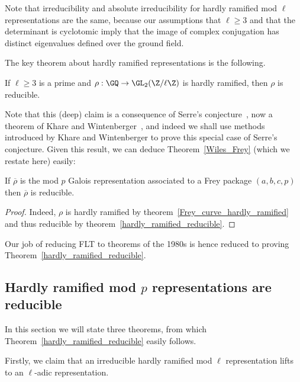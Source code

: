 Note that irreducibility and absolute irreducibility for hardly ramified mod $\ell$ representations
are the same, because our assumptions that $\ell\geq3$
and that the determinant is cyclotomic imply that the image of complex conjugation
has distinct eigenvalues defined over the ground field.

The key theorem about hardly ramified representations is the following.

\begin{theorem}
  \label{hardly_ramified_reducible}
  \leanok
  If $\ell\geq 3$ is a prime and $\rho:\GQ\to\GL_2(\Z/\ell\Z)$ is hardly ramified,
  then $\rho$ is reducible.
\end{theorem}

Note that this (deep) claim is a consequence of Serre's conjecture~\cite{serreconj},
now a theorem of Khare and Wintenberger~\cite{kwII}, and indeed we shall use
methods introduced by Khare and Wintenberger to prove this special case of
Serre's conjecture. Given this result, we can deduce Theorem~\ref{Wiles_Frey}
(which we restate here) easily:

\begin{theorem}
  \label{Wiles_Frey_again}
  \leanok
  If $\overline{\rho}$ is the mod $p$ Galois representation associated to a Frey package $(a,b,c,p)$ then
  $\overline{\rho}$ is reducible.
\end{theorem}
\begin{proof}
  Indeed, $\rho$ is hardly ramified by theorem~\ref{Frey_curve_hardly_ramified}
  and thus reducible by theorem~\ref{hardly_ramified_reducible}.
\end{proof}

Our job of reducing FLT to theorems of the 1980s is hence reduced to proving
Theorem~\ref{hardly_ramified_reducible}.

\subsection{Hardly ramified mod $p$ representations are reducible}

In this section we will state three theorems, from which Theorem~\ref{hardly_ramified_reducible}
easily follows.

Firstly, we claim that
an irreducible hardly ramified mod $\ell$ representation lifts to an $\ell$-adic representation.

